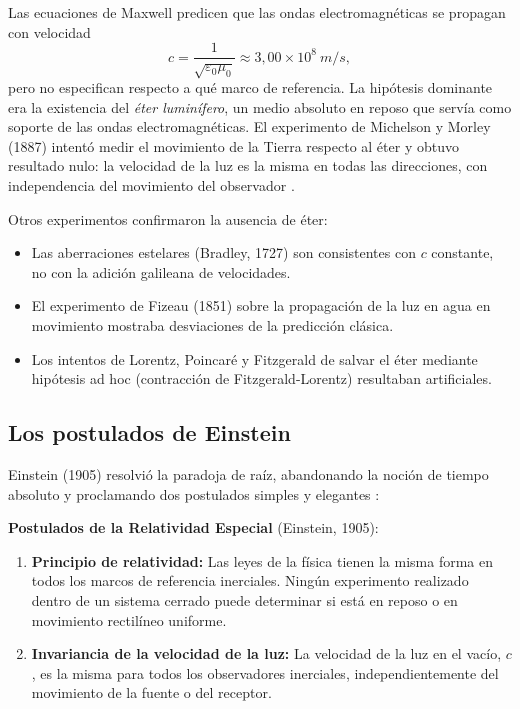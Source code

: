 Las ecuaciones de Maxwell predicen que las ondas electromagnéticas se propagan con velocidad
\[
  c = \frac{1}{\sqrt{\varepsilon_0 \mu_0}} \approx 3{,}00 \times 10^8\ \si{m/s},
\]
pero no especifican respecto a qué marco de referencia. La hipótesis dominante era la existencia del \emph{éter luminífero}, un medio absoluto en reposo que servía como soporte de las ondas electromagnéticas. El experimento de Michelson y Morley (1887) intentó medir el movimiento de la Tierra respecto al éter y obtuvo resultado nulo: la velocidad de la luz es la misma en todas las direcciones, con independencia del movimiento del observador \cite{Jackson1999}.

Otros experimentos confirmaron la ausencia de éter:
\begin{itemize}[leftmargin=2em]
  \item Las aberraciones estelares (Bradley, 1727) son consistentes con $c$ constante, no con la adición galileana de velocidades.
  \item El experimento de Fizeau (1851) sobre la propagación de la luz en agua en movimiento mostraba desviaciones de la predicción clásica.
  \item Los intentos de Lorentz, Poincaré y Fitzgerald de salvar el éter mediante hipótesis ad hoc (contracción de Fitzgerald-Lorentz) resultaban artificiales.
\end{itemize}

\subsection{Los postulados de Einstein}

Einstein (1905) resolvió la paradoja de raíz, abandonando la noción de tiempo absoluto y proclamando dos postulados simples y elegantes \cite{Einstein1905}:

\begin{importante}
\textbf{Postulados de la Relatividad Especial} (Einstein, 1905):
\begin{enumerate}[leftmargin=2em, label=\textbf{\Roman*.}]
  \item \textbf{Principio de relatividad:} Las leyes de la física tienen la misma forma en todos los marcos de referencia inerciales. Ningún experimento realizado dentro de un sistema cerrado puede determinar si está en reposo o en movimiento rectilíneo uniforme.
  \item \textbf{Invariancia de la velocidad de la luz:} La velocidad de la luz en el vacío, $c$, es la misma para todos los observadores inerciales, independientemente del movimiento de la fuente o del receptor.
\end{enumerate}
\end{importante}

